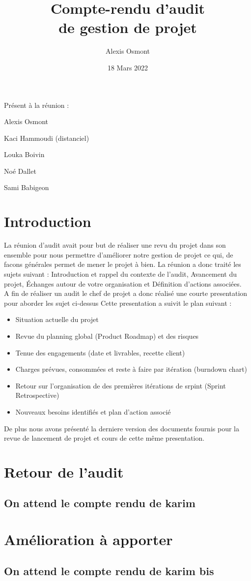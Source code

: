 \documentclass{article}
\title{
    \Huge
    Compte-rendu d'audit\\
    de gestion de projet\\
}
\date{\huge 18 Mars 2022}
\author{\huge Alexis Osmont\\}
\begin{document}
\maketitle
\vspace{5cm}
    Présent à la réunion :
    \begin{description}
        \item Alexis Osmont
        \item Kaci Hammoudi (distanciel)
        \item Louka Boivin
        \item Noé Dallet
        \item Sami Babigeon
    \end{description}
\newpage

\section{Introduction}   

La réunion d'audit avait pour but de réaliser une revu du projet dans son ensemble pour nous permettre 
d'améliorer notre gestion de projet ce qui, de facons générales permet de mener le projet à bien. La réunion
a donc traité les sujets suivant : 
Introduction et rappel du contexte de l’audit,
Avancement du projet,
Échanges autour de votre organisation et 
Définition d’actions associées.\\
\newline
A fin de réaliser un audit le chef de projet a donc réalisé une courte presentation pour aborder les sujet ci-dessus
Cette presentation a suivit le plan suivant :
\begin{itemize}
    \item Situation actuelle du projet
    \item Revue du planning global (Product Roadmap) et des risques
    \item Tenue des engagements (date et livrables, recette client)
    \item Charges prévues, consommées et reste à faire par itération (burndown chart)
    \item Retour sur l’organisation de des premières itérations de srpint (Sprint Retrospective)
    \item Nouveaux besoins identifiés et plan d’action associé\newline
\end{itemize}

De plus nous avons présenté la derniere version des documents fournis pour la revue de lancement de projet et cours 
de cette même presentation.

\vspace{0.5cm}

\section{Retour de l'audit}
\subsection{On attend le compte rendu de karim}

\section{Amélioration à apporter}
\subsection{On attend le compte rendu de karim bis}

\newpage
\end{document}
